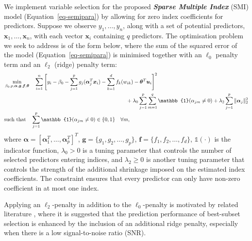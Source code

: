 \documentclass[
  11pt,
  a4paper,
]{article}
\begin{document}
We implement variable selection for the proposed \textbf{\emph{Sparse
Multiple Index}} (SMI) model (Equation~\ref{eq-semipara}) by allowing
for zero index coefficients for predictors. Suppose we observe
\(y_1,\dots,y_n\), along with a set of potential predictors,
\(\bm{x}_1,\dots,\bm{x}_n\), with each vector \(\bm{x}_i\) containing
\(q\) predictors. The optimisation problem we seek to address is of the
form below, where the sum of the squared error of the model
(Equation~\ref{eq-semipara}) is minimised together with an \(\ell_{0}\)
penalty term and an \(\ell_{2}\) (ridge) penalty term: \begin{align}
  & \min_{\beta_{0}, p, \bm{\alpha}, \bm{g}, \bm{f}, \bm{\theta}} \quad \sum_{i = 1}^{n}\Bigg [ y_{i} - \beta_{0} - \sum_{j = 1}^{p}g_{j}(\bm{\alpha}_{j}^{T}\bm{x}_{i}) - \sum_{k = 1}^{d}f_{k}(w_{ik}) - \bm{\theta}^{T}\bm{u}_{i}\Bigg]^{2} \label{eq-smi}\\
  & \hspace*{8cm} + \lambda_{0}\sum_{j = 1}^{p}\sum_{m = 1}^{q}\mathbb{1}(\alpha_{jm} \neq 0) + \lambda_{2}\sum_{j = 1}^{p}\|\bm{\alpha}_{j}\|_2^2 \nonumber \\
  & \text{such that}\quad \sum_{j=1}^p \mathbb{1}(\alpha_{jm} \neq 0) \in \{0,1\} \quad \forall m ,\nonumber
\end{align} where
\(\bm{\alpha} = [\bm{\alpha}_{1}^{T}, \dots, \bm{\alpha}_{p}^{T} ]^{T}\),
\(\bm{g} = \{g_{1}, g_{2}, \dots, g_{p}\}\),
\(\bm{f} = \{f_{1}, f_{2}, \dots, f_{d}\}\), \(\mathbb{1}(\cdot)\) is
the indicator function, \(\lambda_{0} > 0\) is a tuning parameter that
controls the number of selected predictors entering indices, and
\(\lambda_{2} \ge 0\) is another tuning parameter that controls the
strength of the additional shrinkage imposed on the estimated index
coefficients. The constraint ensures that every predictor can only have
non-zero coefficient in at most one index.

Applying an \(\ell_{2}\)-penalty in addition to the \(\ell_{0}\)-penalty
is motivated by related literature
\autocite{Hazimeh2020,Mazumder2022,Hazimeh2023}, where it is suggested
that the prediction performance of best-subset selection is enhanced by
the inclusion of an additional ridge penalty, especially when there is a
low signal-to-noise ratio (SNR).
\end{document}
